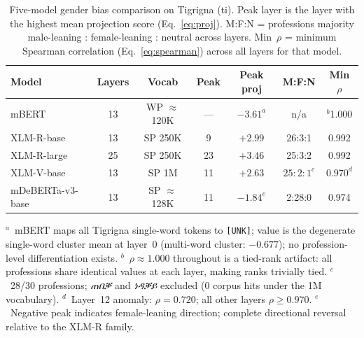 \documentclass[10pt]{article}
\begin{document}
\begin{table}[H]
\centering
\caption{Five-model gender bias comparison on Tigrigna (ti). Peak layer is
         the layer with the highest mean projection score (Eq.~\ref{eq:proj}).
         M:F:N = professions majority male-leaning : female-leaning : neutral
         across layers. Min~$\rho$ = minimum Spearman correlation
         (Eq.~\ref{eq:spearman}) across all layers for that model.}
\label{tab:model-comparison}
\small
\begin{tabular}{lcccccc}
\toprule
\textbf{Model} & \textbf{Layers} & \textbf{Vocab} & \textbf{Peak} & \textbf{Peak proj} & \textbf{M:F:N} & \textbf{Min $\rho$} \\
\midrule
mBERT              & 13 & WP $\approx$120K   & ---  & $-3.61^{a}$  & n/a    & ${}^{b}$1.000 \\
XLM-R-base         & 13 & SP 250K            &   9  & $+2.99$      & 26:3:1 & 0.992 \\
XLM-R-large        & 25 & SP 250K            &  23  & $+3.46$      & 25:3:2 & 0.992 \\
XLM-V-base         & 13 & SP 1M              &  11  & $+2.63$      & $25{:}2{:}1^{c}$ & $0.970^{d}$ \\
mDeBERTa-v3-base   & 13 & SP $\approx$128K   &  11  & $-1.84^{e}$  & 2:28:0 & 0.974 \\
\bottomrule
\end{tabular}
\begin{minipage}{\linewidth}
\smallskip\footnotesize
$^{a}$~mBERT maps all Tigrigna single-word tokens to \texttt{[UNK]};
  value is the degenerate single-word cluster mean at layer~0
  (multi-word cluster: $-0.677$); no profession-level differentiation exists.\newline
$^{b}$~$\rho \approx 1.000$ throughout is a tied-rank artifact: all professions
  share identical values at each layer, making ranks trivially tied.\newline
$^{c}$~28/30 professions; \textit{ጠበቓ} and \textit{ነዳቓይ} excluded
  (0 corpus hits under the 1M vocabulary).\newline
$^{d}$~Layer~12 anomaly: $\rho = 0.720$; all other layers $\rho \geq 0.970$.\newline
$^{e}$~Negative peak indicates female-leaning direction; complete directional
  reversal relative to the XLM-R family.
\end{minipage}
\end{table}

\end{document}
